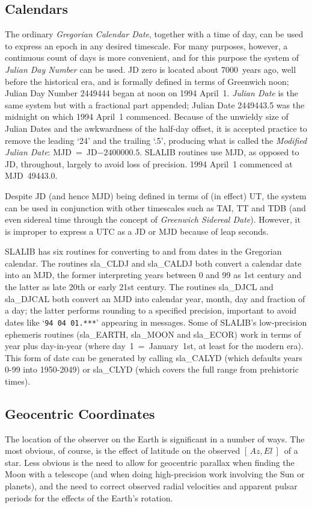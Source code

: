 \documentclass[11pt,twoside]{article}
\newcommand{\azel}      {$[\,Az,El~]$}
\begin{document}
\subsection{Calendars}
The ordinary {\it Gregorian Calendar Date},
together with a time of day, can be
used to express an epoch in any desired timescale.  For many purposes,
however, a continuous count of days is more convenient, and for
this purpose the system of {\it Julian Day Number}\/ can be used.
JD zero is located about 7000~years ago, well before the
historical era, and is formally defined in terms of Greenwich noon;
Julian Day Number 2449444 began at noon on 1994 April~1.  {\it Julian Date}\/
is the same system but with a fractional part appended;
Julian Date 2449443.5 was the midnight on which 1994 April~1
commenced.  Because of the unwieldy size of Julian Dates
and the awkwardness of the half-day offset, it is
accepted practice to remove the leading `24' and the trailing `.5',
producing what is called the {\it Modified Julian Date}:
MJD~=~JD$-2400000.5$.  SLALIB routines use MJD, as opposed to
JD, throughout, largely to avoid loss of precision.
1994 April~1 commenced at MJD~49443.0.

Despite JD (and hence MJD) being defined in terms of (in effect)
UT, the system can be used in conjunction with other timescales
such as TAI, TT and TDB (and even sidereal time through the
concept of {\it Greenwich Sidereal Date}).  However, it is improper
to express a UTC as a JD or MJD because of leap seconds.

SLALIB has six routines for converting to and from dates in
the Gregorian calendar.  The routines
sla\_CLDJ
and
sla\_CALDJ
both convert a calendar date into an MJD, the former interpreting
years between 0 and 99 as 1st century and the latter as late 20th or
early 21st century.  The routines sla\_DJCL
and
sla\_DJCAL
both convert an MJD into calendar year, month, day and fraction of a day;
the latter performs rounding to a specified precision, important
to avoid dates like `{\tt 94 04 01.***}' appearing in messages.
Some of SLALIB's low-precision ephemeris routines
(sla\_EARTH,
sla\_MOON
and
sla\_ECOR)
work in terms of year plus day-in-year (where
day~1~=~January~1st, at least for the modern era).
This form of date can be generated by
calling
sla\_CALYD
(which defaults years 0-99 into 1950-2049)
or
sla\_CLYD
(which covers the full range from prehistoric times).

\subsection{Geocentric Coordinates}
The location of the observer on the Earth is significant in a
number of ways.  The most obvious, of course, is the effect of latitude
on the observed \azel\ of a star.  Less obvious is the need to
allow for geocentric parallax when finding the Moon with a
telescope (and when doing high-precision work involving the
Sun or planets), and the need to correct observed radial
velocities and apparent pulsar periods for the effects
of the Earth's rotation.
\end{document}
